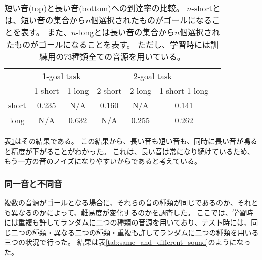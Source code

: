 \begin{table}[tb]
    \centering
    \caption[短い音と長い音への到達率]
    {
        短い音(top)と長い音(bottom)への到達率の比較。
        $n$-shortとは、短い音の集合から$n$個選択されたものがゴールになることを表す。
        また、$n$-longとは長い音の集合から$n$個選択されたものがゴールになることを表す。
        ただし、学習時には訓練用の73種類全ての音源を用いている。
    }
    \label{tab:long_and_short}
    \begin{tabular}{@{}ccccccc@{}}
      \toprule
      & \multicolumn{2}{c}{1-goal task} & \multicolumn{3}{c}{2-goal task} \\
      \cmidrule(lr){2-3} \cmidrule(lr){4-6} 
      & 1-short & 1-long & 2-short & 2-long & 1-short-1-long \\
      \midrule
      short & 0.235 & N/A & 0.160 & N/A & 0.141 \\
      long & N/A & 0.632 & N/A & 0.255 & 0.262 \\
      \bottomrule
    \end{tabular}
\end{table}

表\ref{tab:long_and_short}はその結果である。
この結果から、長い音も短い音も、同時に長い音が鳴ると精度が下がることがわかった。
これは、長い音は常になり続けているため、もう一方の音のノイズになりやすいからであると考えている。



\subsubsection{同一音と不同音}

複数の音源がゴールとなる場合に、それらの音の種類が同じであるのか、それとも異なるのかによって、難易度が変化するのかを調査した。
ここでは、学習時には重複も許してランダムに二つの種類の音源を用いており、テスト時には、同じ二つの種類・異なる二つの種類・重複も許してランダムに二つの種類を用いる三つの状況で行った。
結果は表\ref{tab:same_and_different_sound}のようになった。

